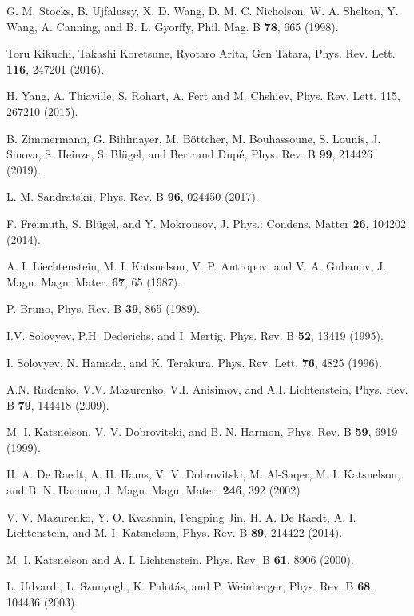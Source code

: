 \documentclass[aps,prl,twocolumn,showpacs,amsmath,amssymb]{revtex4-1}
\begin{document}
\begin{thebibliography}{199}
 G. M. Stocks, B. Ujfalussy, X. D. Wang, D. M. C. Nicholson, W. A. Shelton,
Y. Wang, A. Canning, and B. L. Gyorffy, Phil. Mag. B {\bf 78},
665 (1998).

Toru Kikuchi, Takashi Koretsune, Ryotaro Arita, Gen Tatara, Phys. Rev. Lett. {\bf 116}, 247201 (2016).

H. Yang, A. Thiaville, S. Rohart, A. Fert and M. Chshiev, Phys. Rev. Lett. 115, 267210 (2015).

B. Zimmermann, G. Bihlmayer, M. B{\"o}ttcher, M. Bouhassoune, S. Lounis, J. Sinova, S. Heinze, S. Bl{\"u}gel, and Bertrand Dup{\'e}, Phys. Rev. B  {\bf 99}, 214426 (2019).

L. M. Sandratskii, Phys. Rev. B {\bf 96}, 024450 (2017).

 F. Freimuth, S. Bl\"ugel, and Y. Mokrousov, J. Phys.: Condens. Matter {\bf 26}, 104202 (2014).

 A. I. Liechtenstein, M. I. Katsnelson, V. P. Antropov, and
V. A. Gubanov, J. Magn. Magn. Mater. {\bf 67}, 65 (1987).

  P. Bruno, Phys. Rev. B {\bf 39}, 865 (1989).

 I.V. Solovyev, P.H. Dederichs, and I. Mertig, Phys. Rev. B {\bf 52}, 13419 (1995).

I. Solovyev, N. Hamada, and K. Terakura, Phys. Rev. Lett. {\bf 76}, 4825 (1996).

A.N. Rudenko, V.V. Mazurenko, V.I. Anisimov, and A.I. Lichtenstein, Phys. Rev. B {\bf 79}, 144418 (2009).

M. I. Katsnelson, V. V. Dobrovitski, and B. N. Harmon, 
Phys. Rev. B {\bf 59}, 6919 (1999).

H. A. De Raedt, A. H. Hams, V. V. Dobrovitski, M. Al-Saqer, M. I. 
Katsnelson, and B. N. Harmon, 
J. Magn. Magn. Mater. {\bf 246}, 392 (2002)

V. V. Mazurenko, Y. O. Kvashnin, Fengping Jin, H. A. De Raedt, A. I. Lichtenstein, and M. I. Katsnelson, Phys. Rev. B {\bf 89}, 214422 (2014).

 M. I. Katsnelson and A. I. Lichtenstein, Phys. Rev. B {\bf 61}, 8906 (2000).

 L. Udvardi, L. Szunyogh, K. Palot{\'a}s, and P. Weinberger, Phys. Rev. B {\bf 68}, 104436 (2003).


\end{thebibliography}
\end{document}
